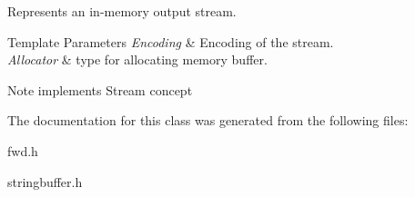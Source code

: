 Represents an in-\/memory output stream. 


\begin{DoxyTemplParams}{Template Parameters}
{\em Encoding} & Encoding of the stream. \\
\hline
{\em Allocator} & type for allocating memory buffer. \\
\hline
\end{DoxyTemplParams}
\begin{DoxyNote}{Note}
implements Stream concept 
\end{DoxyNote}


The documentation for this class was generated from the following files\+:\begin{DoxyCompactItemize}
\item 
fwd.\+h\item 
stringbuffer.\+h\end{DoxyCompactItemize}
